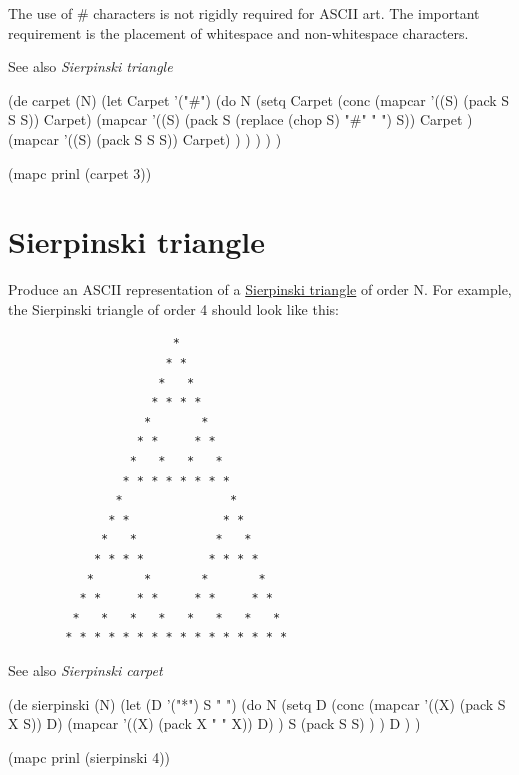 The use of \# characters is not rigidly required for ASCII art. The
important requirement is the placement of whitespace and non-whitespace
characters.

See also \emph{Sierpinski triangle}

\begin{wideverbatim}

(de carpet (N)
   (let Carpet '("#")
      (do N
         (setq Carpet
            (conc
               (mapcar '((S) (pack S S S)) Carpet)
               (mapcar
                  '((S) (pack S (replace (chop S) "#" " ") S))
                  Carpet )
               (mapcar '((S) (pack S S S)) Carpet) ) ) ) ) )

(mapc prinl (carpet 3))

\end{wideverbatim}

\pagebreak{}
\section*{Sierpinski triangle}

Produce an ASCII representation of a
\href{http://en.wikipedia.org/wiki/Sierpinski\_triangle}{Sierpinski
triangle} of order N. For example, the Sierpinski triangle of order 4
should look like this:

\begin{verbatim}
                       *
                      * *
                     *   *
                    * * * *
                   *       *
                  * *     * *
                 *   *   *   *
                * * * * * * * *
               *               *
              * *             * *
             *   *           *   *
            * * * *         * * * *
           *       *       *       *
          * *     * *     * *     * *
         *   *   *   *   *   *   *   *
        * * * * * * * * * * * * * * * *
\end{verbatim}

See also \emph{Sierpinski carpet}


\begin{wideverbatim}

(de sierpinski (N)
   (let (D '("*")  S " ")
      (do N
         (setq
            D (conc
               (mapcar '((X) (pack S X S)) D)
               (mapcar '((X) (pack X " " X)) D) )
            S (pack S S) ) )
      D ) )

(mapc prinl (sierpinski 4))

\end{wideverbatim}

